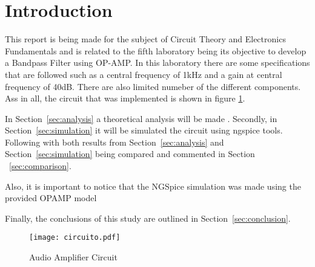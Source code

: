 \section{Introduction}
\label{sec:introduction}


\hspace{0,5cm} This report is being made for the subject of Circuit Theory and Electronics Fundamentals and is related to the fifth laboratory being its objective to develop a Bandpass Filter using OP-AMP. In this laboratory there are some specifications that are followed such as a central frequency of 1kHz and a gain at central frequency of 40dB. There are also limited numeber of the different components. Ass in all, the circuit that was implemented is shown in figure \ref{fig:circuito}.
\par In Section~\ref{sec:analysis} a theoretical analysis will be made . Secondly, in Section~\ref{sec:simulation} it will be simulated the circuit using ngspice tools. Following with both results from Section~\ref{sec:analysis} and Section~\ref{sec:simulation} being compared and commented in Section ~\ref{sec:comparison}. 
\par Also, it is important to notice that the NGSpice simulation was made using the provided OPAMP model
\par Finally, the conclusions of this study are outlined in Section~\ref{sec:conclusion}.

\begin{figure}[H] \centering
\texttt{[image: circuito.pdf]}
\caption{Audio Amplifier Circuit}
\label{fig:circuito}
\end{figure}


